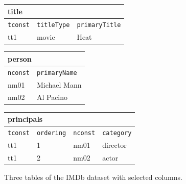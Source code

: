 \begin{figure}[!htbp]
  \centering
  \small
  \begin{tabular}{lll}
    \multicolumn{3}{l}{\textbf{title}} \\
    \hline
    \texttt{tconst} & \texttt{titleType} & \texttt{primaryTitle} \\
    \hline
    tt1 & movie & Heat \\
  \end{tabular}
  \qquad
  \begin{tabular}{ll}
    \multicolumn{2}{l}{\textbf{person}} \\
    \hline
    \texttt{nconst} & \texttt{primaryName} \\
    \hline
    nm01 & Michael Mann \\
    nm02 & Al Pacino \\
  \end{tabular}

  \vspace{0.6em}
  \begin{tabular}{llll}
    \multicolumn{4}{l}{\textbf{principals}} \\
    \hline
    \texttt{tconst} & \texttt{ordering} & \texttt{nconst} & \texttt{category} \\
    \hline
    tt1 & 1 & nm01 & director \\
    tt1 & 2 & nm02 & actor \\
  \end{tabular}
  \caption{Three tables of the IMDb dataset with selected columns.}
  \label{fig:imdb-tables}
\end{figure}

